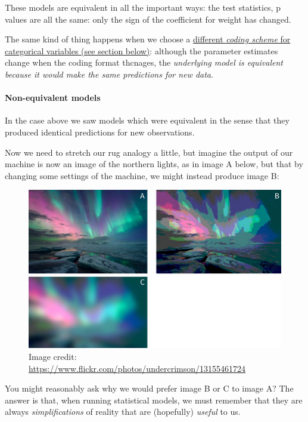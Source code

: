 \documentclass[]{article}
\let\oldparagraph\paragraph
\renewcommand{\paragraph}[1]{\oldparagraph{#1}\mbox{}}
\theoremstyle{definition}
\theoremstyle{definition}
\theoremstyle{definition}
\theoremstyle{remark}
\begin{document}
These models are equivalent in all the important ways: the test
statistics, p values are all the same: only the sign of the coefficient
for weight has changed.

The same kind of thing happens when we choose a
\protect\hyperlink{regression-coding}{different \emph{coding scheme} for
categorical variables (see section below)}: although the parameter
estimates change when the coding format thcnages, the \emph{underlying
model is equivalent because it would make the same predictions for new
data}.

\paragraph{Non-equivalent models}\label{non-equivalent-models}

In the case above we saw models which were equivalent in the sense that
they produced identical predictions for new observations.

Now we need to stretch our rug analogy a little, but imagine the output
of our machine is now an image of the northern lights, as in image A
below, but that by changing some settings of the machine, we might
instead produce image B:

\begin{figure}
\centering
\includegraphics{media/aurora.jpg}
\caption{Image credit:
\url{https://www.flickr.com/photos/undercrimson/13155461724}}
\end{figure}

You might reasonably ask why we would prefer image B or C to image A?
The answer is that, when running statistical models, we must remember
that they are always \emph{simplifications} of reality that are
(hopefully) \emph{useful} to us.
\end{document}
